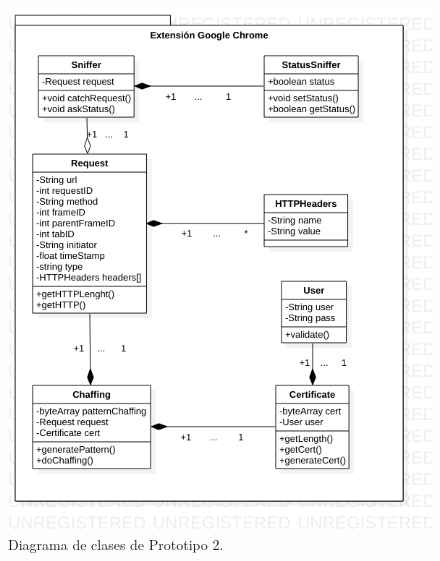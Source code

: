 \documentclass[12pt, a4paper, titlepage]{report}
\begin{document}
    			\begin{figure}[H]
    				\begin{center}	\includegraphics[width=13cm]{./imagenes/Desarrollo/Prototipo_2/DC_P2.png}
    				\caption{Diagrama de clases de Prototipo 2.}
    				\end{center}
    			\end{figure}
			    
			    \newpage
\end{document}
